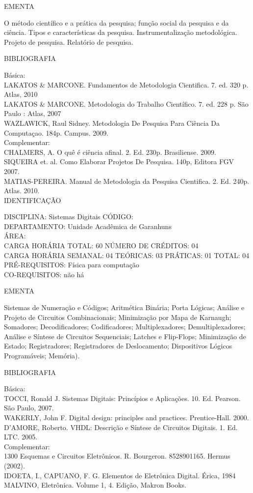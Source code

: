 \documentclass[
	12pt,				%
	openright,			%
  oneside,     %
	a4paper,			%
	english,			%
	french,				%
	spanish,			%
	brazil				%
	]{abntex2}
\begin{document}
\begin{apendicesenv}
EMENTA 

O método científico e a prática da pesquisa; função social da pesquisa e
da ciência. Tipos e características da pesquisa. Instrumentalização
metodológica. Projeto de pesquisa. Relatório de pesquisa.

BIBLIOGRAFIA 

Básica:\\
LAKATOS \& MARCONE. Fundamentos de Metodologia Cientifica. 7. ed. 320 p.
Atlas, 2010\\
LAKATOS \& MARCONE. Metodologia do Trabalho Científico. 7. ed. 228 p.
São Paulo : Atlas, 2007\\
WAZLAWICK, Raul Sidney. Metodologia De Pesquisa Para Ciência Da
Computaçao. 184p. Campus. 2009.\\
Complementar:\\
CHALMERS, A. O quê é ciência afinal. 2. Ed. 230p. Brasiliense. 2009.\\
SIQUEIRA et. al. Como Elaborar Projetos De Pesquisa. 140p, Editora FGV
2007.\\
MATIAS-PEREIRA. Manual de Metodologia da Pesquisa Cientifica. 2. Ed.
240p. Atlas. 2010.\\

\newpage IDENTIFICAÇÃO

DISCIPLINA: Sistemas Digitais CÓDIGO:\\ 
DEPARTAMENTO: Unidade Acadêmica de Garanhuns\\
ÁREA: \\
CARGA HORÁRIA TOTAL: 60 NÚMERO DE CRÉDITOS: 04\\
CARGA HORÁRIA SEMANAL: 04 TEÓRICAS: 03 PRÁTICAS: 01 TOTAL: 04\\
PRÉ-REQUISITOS: Física para computação\\
CO-REQUISITOS: não há

EMENTA 

Sistemas de Numeração e Códigos; Aritmética Binária; Porta Lógicas;
Análise e Projeto de Circuitos Combinacionais; Minimização por Mapa de
Karnaugh; Somadores; Decodificadores; Codificadores; Multiplexadores;
Demultiplexadores; Análise e Síntese de Circuitos Sequenciais; Latches
e Flip-Flops; Minimização de Estado; Registradores; Registradores de
Deslocamento; Dispositivos Lógicos Programáveis; Memória).

BIBLIOGRAFIA 

Básica:\\
TOCCI, Ronald J. Sistemas Digitais: Princípios e Aplicações. 10. Ed.
Pearson. São Paulo, 2007.\\
WAKERLY, John F. Digital design: principles and practices.
Prentice-Hall. 2000. D'AMORE, Roberto. VHDL: Descrição
e Síntese de Circuitos Digitais. 1. Ed. LTC. 2005.\\
Complementar:\\
1300 Esquemas e Circuitos Eletrônicos. R. Bourgeron. 8528901165. Hermus
(2002).\\
IDOETA, I., CAPUANO, F. G. Elementos de Eletrônica Digital. Érica, 1984\\
MALVINO, Eletrônica. Volume 1, 4. Edição, Makron Books.\\



\end{apendicesenv}
\end{document}
